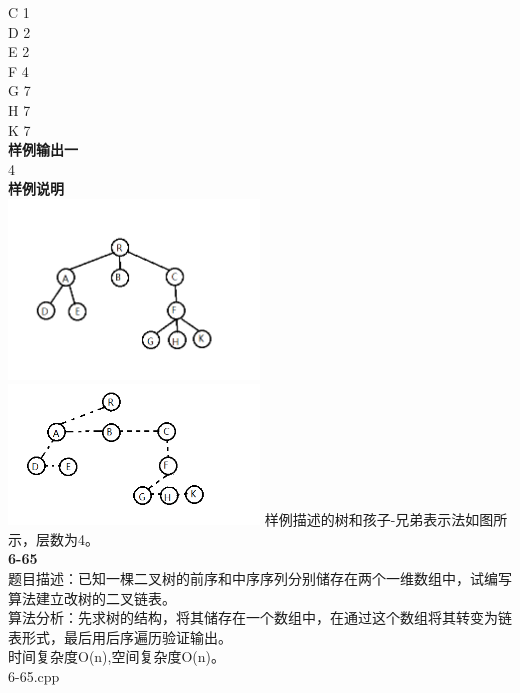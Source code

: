 \documentclass[UTF8,a4paper]{article}
\begin{document}
C 1\\
D 2\\
E 2\\
F 4\\
G 7\\
H 7\\
K 7\\
\textbf{样例输出一}\\
4\\
\textbf{样例说明}\\
\includegraphics[width=0.5\textwidth]{6-62.png}
\includegraphics[width=0.5\textwidth]{6-62-1.png}
样例描述的树和孩子-兄弟表示法如图所示，层数为4。\\
\newpage
\noindent\textbf{6-65}\\
题目描述：已知一棵二叉树的前序和中序序列分别储存在两个一维数组中，试编写算法建立改树的二叉链表。\\
算法分析：先求树的结构，将其储存在一个数组中，在通过这个数组将其转变为链表形式，最后用后序遍历验证输出。\\
时间复杂度O(n),空间复杂度O(n)。\\
6-65.cpp
\end{document}
